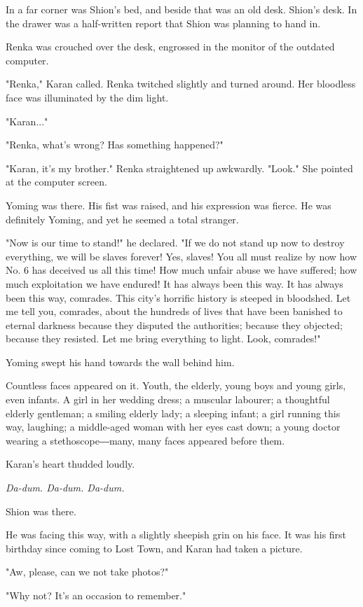 In a far corner was Shion's bed, and beside that was an old desk.
Shion's desk. In the drawer was a half-written report that Shion was
planning to hand in.

Renka was crouched over the desk, engrossed in the monitor of the
outdated computer.

"Renka," Karan called. Renka twitched slightly and turned around. Her
bloodless face was illuminated by the dim light.

"Karan..."

"Renka, what's wrong? Has something happened?"

"Karan, it's my brother." Renka straightened up awkwardly. "Look." She
pointed at the computer screen.

Yoming was there. His fist was raised, and his expression was fierce. He
was definitely Yoming, and yet he seemed a total stranger.

"Now is our time to stand!" he declared. "If we do not stand up now to
destroy everything, we will be slaves forever! Yes, slaves! You all must
realize by now how No. 6 has deceived us all this time! How much unfair
abuse we have suffered; how much exploitation we have endured! It has
always been this way. It has always been this way, comrades. This city's
horrific history is steeped in bloodshed. Let me tell you, comrades,
about the hundreds of lives that have been banished to eternal darkness
because they disputed the authorities; because they objected; because
they resisted. Let me bring everything to light. Look, comrades!"

Yoming swept his hand towards the wall behind him.

Countless faces appeared on it. Youth, the elderly, young boys and young
girls, even infants. A girl in her wedding dress; a muscular labourer; a
thoughtful elderly gentleman; a smiling elderly lady; a sleeping infant;
a girl running this way, laughing; a middle-aged woman with her eyes
cast down; a young doctor wearing a stethoscope―many, many faces
appeared before them.

Karan's heart thudded loudly.

\emph{Da-dum. Da-dum. Da-dum.}

Shion was there.

He was facing this way, with a slightly sheepish grin on his face. It
was his first birthday since coming to Lost Town, and Karan had taken a
picture.

"Aw, please, can we not take photos?"

"Why not? It's an occasion to remember."

